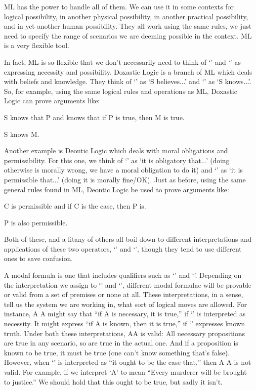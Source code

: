 ML has the power to handle all of them. We can use it in some contexts for logical possibility, in another physical possibility, in another practical possibility, and in yet another human possibility. They all work using the same rules, we just need to specify the range of scenarios we are deeming possible in the context. ML is a very flexible tool.

In fact, ML is so flexible that we don't necessarily need to think of `\ebox'  and `\ediamond'  as expressing necessity and possibility. Doxastic Logic is a branch of ML which deals with beliefs and knowledge. They think of `\ediamond'  as `S believes...' and `\ebox'  as `S knows...'. So, for example, using the same logical rules and operations as ML, Doxastic Logic can prove arguments like:
\begin{earg}
\item[]S knows that P and knows that if P is true, then M is true. 
\item[\therefore] S knows M. 
\end{earg}
Another example is  Deontic Logic which deals with moral obligations and permissibility. For this one, we think of `\ebox' as `it is obligatory that...' (doing otherwise is morally wrong, we have a moral obligation to do it) and `\ediamond'  as `it is permissible that...' (doing it is morally fine/OK). Just as before, using the same general rules found in ML, Deontic Logic be used to prove arguments like:
\begin{earg}
\item[]C is permissible and if C is the case, then P is. 
\item[\therefore] P is also permissible. 
\end{earg}
Both of these, and a litany of others all boil down to different interpretations and applications of these two operators, `\ebox'  and `\ediamond', though they tend to use different ones to save confusion.

A modal formula is one that includes qualifiers such as `\ebox' and `\ediamond'. Depending on the interpretation we assign to `\ebox' and `\ediamond', different modal formulae will be provable or valid from a set of premises or none at all. These interpretations, in a sense, tell us the system we are working in, what sort of logical moves are allowed. For instance, \ebox A \eif A might say that “if A is necessary, it is true,” if `\ebox'  is interpreted as necessity. It might express “if A is known, then it is true,” if `\ebox'  expresses known truth. Under both these interpretations, \ebox A\eif A is valid: All necessary propositions are true in any scenario, so are true in the actual one. And if a proposition is known to be true, it must be true (one can’t know something that’s false). However, when `\ebox'  is interpreted as “it ought to be the case that,” then \ebox A \eif A is not valid. For example, if we interpret `A' to mean “Every murderer will be brought to justice.” We should hold that this ought to be true, but sadly it isn't.

